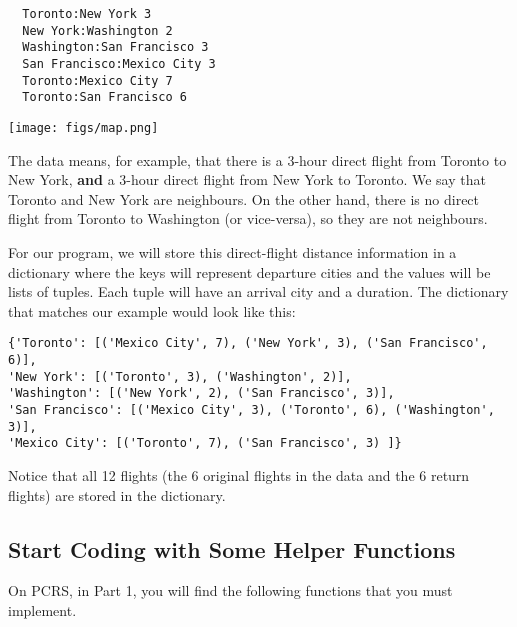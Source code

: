 \documentclass{assignment}
\begin{document}
\vspace*{-0.3cm}
\begin{minipage}[c]{0.45\linewidth}
\begin{verbatim}
  Toronto:New York 3
  New York:Washington 2
  Washington:San Francisco 3
  San Francisco:Mexico City 3
  Toronto:Mexico City 7
  Toronto:San Francisco 6
\end{verbatim}
\end{minipage}
\hspace{1cm}
\begin{minipage}[c]{0.45\linewidth}
\texttt{[image: figs/map.png]}
\end{minipage}
\vspace*{-0.5cm}

The data means, for example, that there is a 3-hour direct flight from Toronto to New York, {\bf and} a 3-hour direct flight from New York to Toronto. We say that Toronto and New York are neighbours. On the other hand, there is no direct flight from Toronto to Washington (or vice-versa), so they are not neighbours. 

For our program, we will store this direct-flight distance information in a dictionary where the keys will represent departure cities and the values
will be lists of tuples. Each tuple will have an arrival city and a duration. The dictionary that matches our example would look
like this: 
\begin{verbatim}
{'Toronto': [('Mexico City', 7), ('New York', 3), ('San Francisco', 6)],
'New York': [('Toronto', 3), ('Washington', 2)],
'Washington': [('New York', 2), ('San Francisco', 3)],
'San Francisco': [('Mexico City', 3), ('Toronto', 6), ('Washington', 3)],
'Mexico City': [('Toronto', 7), ('San Francisco', 3) ]}
\end{verbatim}

Notice that all 12 flights (the 6 original flights in the data and the 6 return flights) are stored in the dictionary.

\subsection*{Start Coding with Some Helper Functions}
On PCRS, in Part 1, you will find the following functions that you must implement.
\end{document}

